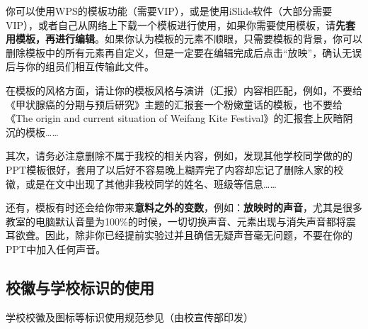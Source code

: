你可以使用WPS的模板功能（需要VIP），或是使用iSlide软件（大部分需要VIP），或者自己从网络上下载一个模板进行使用，如果你需要使用模板，请\textbf{先套用模板，再进行编辑}。如果你认为模板的元素不顺眼，只需要模板的背景，你可以删除模板中的所有元素再自定义，但是一定要在编辑完成后点击“放映”，确认无误后与你的组员们相互传输此文件。

在模板的风格方面，请让你的模板风格与演讲（汇报）内容相匹配，例如，不要给《甲状腺癌的分期与预后研究》主题的汇报套一个粉嫩童话的模板，也不要给《The origin and current situation of Weifang Kite Festival》的汇报套上灰暗阴沉的模板……

其次，请务必注意删除不属于我校的相关内容，例如，发现其他学校同学做的的PPT模板很好，套用了以后好不容易晚上糊弄完了内容却忘记了删除人家的校徽，或是在文中出现了其他非我校同学的姓名、班级等信息……

还有，模板有时还会给你带来\textbf{意料之外的变数}，例如：\textbf{放映时的声音}，尤其是很多教室的电脑默认音量为100\%的时候，一切切换声音、元素出现与消失声音都将震耳欲聋。因此，除非你已经提前实验过并且确信无疑声音毫无问题，不要在你的PPT中加入任何声音。

\subsection[校徽与学校标识的使用]{校徽与学校标识的使用}
学校校徽及图标等标识使用规范参见（由校宣传部印发）